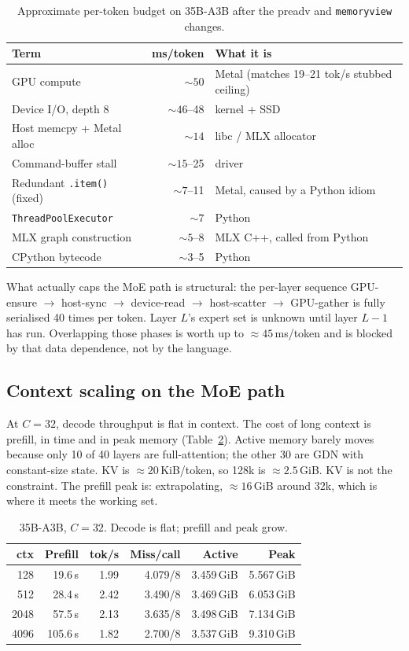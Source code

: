 \begin{table}[ht]
\centering
\caption{Approximate per-token budget on 35B-A3B after the preadv and \texttt{memoryview} changes.}
\label{tab:python}
\begin{tabular}{@{}lrl@{}}
\toprule
Term & ms/token & What it is \\
\midrule
GPU compute & $\sim 50$ & Metal (matches 19--21 tok/s stubbed ceiling) \\
Device I/O, depth 8 & $\sim 46$--48 & kernel + SSD \\
Host memcpy + Metal alloc & $\sim 14$ & libc / MLX allocator \\
Command-buffer stall & $\sim 15$--25 & driver \\
Redundant \texttt{.item()} (fixed) & $\sim 7$--11 & Metal, caused by a Python idiom \\
\texttt{ThreadPoolExecutor} & $\sim 7$ & Python \\
MLX graph construction & $\sim 5$--8 & MLX C++, called from Python \\
CPython bytecode & $\sim 3$--5 & Python \\
\bottomrule
\end{tabular}
\end{table}

What actually caps the MoE path is structural: the per-layer sequence GPU-ensure $\to$ host-sync $\to$ device-read $\to$ host-scatter $\to$ GPU-gather is fully serialised 40 times per token. Layer $L$'s expert set is unknown until layer $L{-}1$ has run. Overlapping those phases is worth up to $\approx 45$\,ms/token and is blocked by that data dependence, not by the language.

\subsection{Context scaling on the MoE path}

At $C{=}32$, decode throughput is flat in context. The cost of long context is prefill, in time and in peak memory (Table~\ref{tab:ctxscale}). Active memory barely moves because only 10 of 40 layers are full-attention; the other 30 are GDN with constant-size state. KV is $\approx 20$\,KiB/token, so 128k is $\approx 2.5$\,GiB. KV is not the constraint. The prefill peak is: extrapolating, $\approx 16$\,GiB around 32k, which is where it meets the working set.

\begin{table}[ht]
\centering
\caption{35B-A3B, $C{=}32$. Decode is flat; prefill and peak grow.}
\label{tab:ctxscale}
\begin{tabular}{@{}rrrrrr@{}}
\toprule
ctx & Prefill & tok/s & Miss/call & Active & Peak \\
\midrule
128 & 19.6\,s & 1.99 & 4.079/8 & 3.459\,GiB & 5.567\,GiB \\
512 & 28.4\,s & 2.42 & 3.490/8 & 3.469\,GiB & 6.053\,GiB \\
2048 & 57.5\,s & 2.13 & 3.635/8 & 3.498\,GiB & 7.134\,GiB \\
4096 & 105.6\,s & 1.82 & 2.700/8 & 3.537\,GiB & 9.310\,GiB \\
\bottomrule
\end{tabular}
\end{table}


